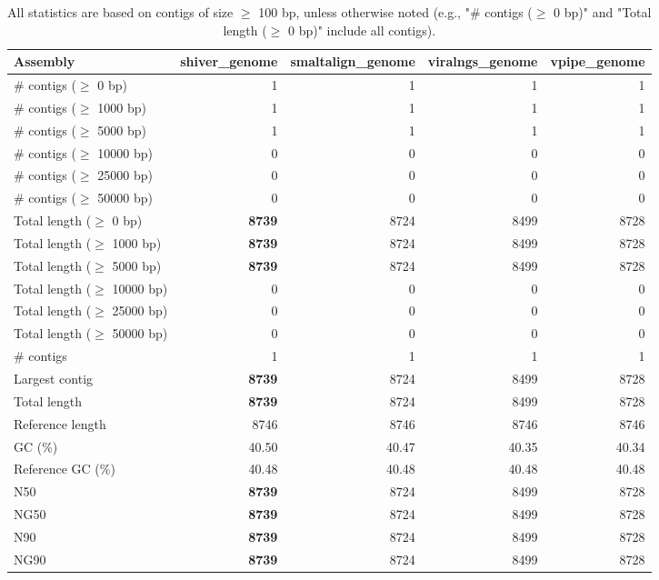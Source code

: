 \documentclass[12pt,a4paper]{article}
\begin{document}
\begin{table}[ht]
\begin{center}
\caption{All statistics are based on contigs of size $\geq$ 100 bp, unless otherwise noted (e.g., "\# contigs ($\geq$ 0 bp)" and "Total length ($\geq$ 0 bp)" include all contigs).}
\begin{tabular}{|l*{4}{|r}|}
\hline
Assembly & shiver\_genome & smaltalign\_genome & viralngs\_genome & vpipe\_genome \\ \hline
\# contigs ($\geq$ 0 bp) & 1 & 1 & 1 & 1 \\ \hline
\# contigs ($\geq$ 1000 bp) & 1 & 1 & 1 & 1 \\ \hline
\# contigs ($\geq$ 5000 bp) & 1 & 1 & 1 & 1 \\ \hline
\# contigs ($\geq$ 10000 bp) & 0 & 0 & 0 & 0 \\ \hline
\# contigs ($\geq$ 25000 bp) & 0 & 0 & 0 & 0 \\ \hline
\# contigs ($\geq$ 50000 bp) & 0 & 0 & 0 & 0 \\ \hline
Total length ($\geq$ 0 bp) & {\bf 8739} & 8724 & 8499 & 8728 \\ \hline
Total length ($\geq$ 1000 bp) & {\bf 8739} & 8724 & 8499 & 8728 \\ \hline
Total length ($\geq$ 5000 bp) & {\bf 8739} & 8724 & 8499 & 8728 \\ \hline
Total length ($\geq$ 10000 bp) & 0 & 0 & 0 & 0 \\ \hline
Total length ($\geq$ 25000 bp) & 0 & 0 & 0 & 0 \\ \hline
Total length ($\geq$ 50000 bp) & 0 & 0 & 0 & 0 \\ \hline
\# contigs & 1 & 1 & 1 & 1 \\ \hline
Largest contig & {\bf 8739} & 8724 & 8499 & 8728 \\ \hline
Total length & {\bf 8739} & 8724 & 8499 & 8728 \\ \hline
Reference length & 8746 & 8746 & 8746 & 8746 \\ \hline
GC (\%) & 40.50 & 40.47 & 40.35 & 40.34 \\ \hline
Reference GC (\%) & 40.48 & 40.48 & 40.48 & 40.48 \\ \hline
N50 & {\bf 8739} & 8724 & 8499 & 8728 \\ \hline
NG50 & {\bf 8739} & 8724 & 8499 & 8728 \\ \hline
N90 & {\bf 8739} & 8724 & 8499 & 8728 \\ \hline
NG90 & {\bf 8739} & 8724 & 8499 & 8728 \\ \hline

\end{tabular}
\end{center}
\end{table}
\end{document}
